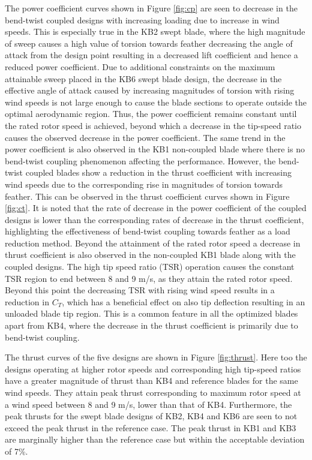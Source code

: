 The power coefficient curves shown in Figure \ref{fig:cp} are seen to decrease in the bend-twist coupled designs with increasing loading due to increase in wind speeds. This is especially true in the KB2 swept blade, where the high magnitude of sweep causes a high value of torsion towards feather decreasing the angle of attack from the design point resulting in a decreased lift coefficient and hence a reduced power coefficient. Due to additional constraints on the maximum attainable sweep placed in the KB6 swept blade design, the decrease in the effective angle of attack caused by increasing magnitudes of torsion with rising wind speeds is not large enough to cause the blade sections to operate outside the optimal aerodynamic region. Thus, the power coefficient remains constant until the rated rotor speed is achieved, beyond which a decrease in the tip-speed ratio causes the observed decrease in the power coefficient. The same trend in the power coefficient is also observed in the KB1 non-coupled blade where there is no bend-twist coupling phenomenon affecting the performance. However, the bend-twist coupled blades show a reduction in the thrust coefficient with increasing wind speeds due to the corresponding rise in magnitudes of torsion towards feather. This can be observed in the thrust coefficient curves shown in Figure \ref{fig:ct}. It is noted that the rate of decrease in the power coefficient of the coupled designs is lower than the corresponding rates of decrease in the thrust coefficient, highlighting the effectiveness of bend-twist coupling towards feather as a load reduction method. Beyond the attainment of the rated rotor speed a decrease in thrust coefficient is also observed in the non-coupled KB1 blade along with the coupled designs. The high tip speed ratio (TSR) operation causes the constant TSR region to end between 8 and 9 m/s, as they attain the rated rotor speed. Beyond this point the decreasing TSR with rising wind speed results in a reduction in $C_T$, which has a beneficial effect on also tip deflection resulting in an unloaded blade tip region. This is a common feature in all the optimized blades apart from KB4, where the decrease in the thrust coefficient is primarily due to bend-twist coupling.         

The thrust curves of the five designs are shown in Figure \ref{fig:thrust}. Here too the designs operating at higher rotor speeds and corresponding high tip-speed ratios have a greater magnitude of thrust than KB4 and reference blades for the same wind speeds. They attain peak thrust corresponding to maximum rotor speed at a wind speed between 8 and 9 m/s, lower than that of KB4. Furthermore, the peak thrusts for the swept blade designs of KB2, KB4 and KB6 are seen to not exceed the peak thrust in the reference case. The peak thrust in KB1 and KB3 are marginally higher than the reference case but within the acceptable deviation of 7\%.

